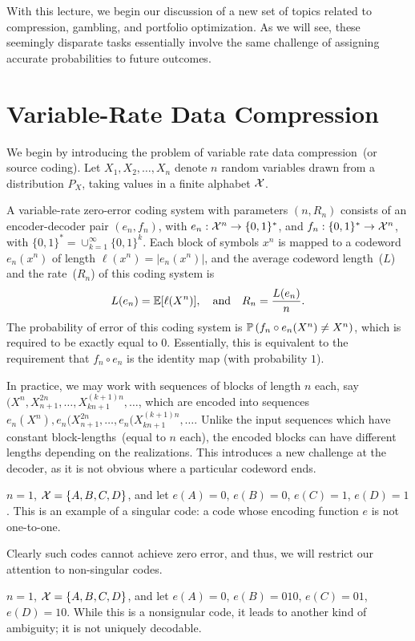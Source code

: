 \documentclass[12pt]{article}
\begin{document}
	\MakeScribeTop
With this lecture, we begin our discussion of a new set of topics related to compression, gambling, and portfolio optimization. As we will see, these seemingly disparate tasks essentially involve the same challenge of assigning accurate probabilities to future outcomes. 


\section{Variable-Rate Data Compression}
We begin by introducing the problem of variable rate data compression~(or source coding). Let $X_1, X_2, \ldots, X_n$ denote $n$ \iid random variables drawn from a distribution $P_X$, taking values in a finite alphabet ${\cal X}$. 
% 
\begin{definition}
    \label{def:variabe-rate-code} A variable-rate zero-error coding system with parameters $(n, R_n)$ consists of an encoder-decoder pair $(e_n, f_n)$, with $e_n:{\cal X}^n \to \{0, 1\}^*$, and $f_n: \{0,1\}^* \to {\cal X}^n$, with $\{0,1\}^* = \cup_{k =1}^{\infty} \{0,1\}^k$. Each block of symbols $x^n$ is mapped to a codeword $e_n(x^n)$ of length $\ell(x^n) = |e_n(x^n)|$, and the average codeword length~($L$) and the rate~($R_n$) of this coding system is 
    \begin{align}
        L(e_n) = \mathbb{E}[\ell(X^n)], \quad \text{and} \quad R_n = \frac{L(e_n)}{n}.  
    \end{align}
    The probability of error of this coding system is $\mathbb{P}\left( f_n \circ e_n (X^n) \neq X^n \right)$, which is required to be exactly equal to $0$. Essentially, this is equivalent to the requirement that $f_n \circ e_n$ is the identity map (with probability $1$). 
\end{definition}
In practice, we may work with sequences of blocks of length $n$ each, say $(X^n, X_{n+1}^{2n}, \ldots, X_{kn+1}^{(k+1)n}, \ldots$, which are encoded into sequences $e_n(X^n), e_n(X_{n+1}^{2n}, \ldots, e_n(X_{kn+1}^{(k+1)n}, \ldots$. Unlike the input sequences which have constant block-lengths~(equal to $n$ each), the encoded blocks can have different lengths depending on the realizations. This introduces a new challenge at the decoder, as it is not obvious where a particular codeword ends.  
\begin{example}
\label{example:variable-rate-code-1}
$n=1$, ${\cal X} = \{A, B, C, D\}$, and let $e(A) = 0$, $e(B) = 0$, $e(C) = 1$, $e(D) = 1$. This is an example of a singular code: a code whose encoding function $e$ is not one-to-one.  \end{example}
Clearly such codes cannot achieve zero error, and thus, we will restrict our attention to non-singular codes. 
\begin{example}
\label{example:variable-rate-code-2}
$n=1$, ${\cal X} = \{A, B, C, D\}$, and let $e(A) = 0$, $e(B) = 010$, $e(C) = 01$, $e(D) = 10$. While this is a nonsignular code, it leads to another kind of ambiguity; it is not uniquely decodable. 
\end{example}
\end{document}
